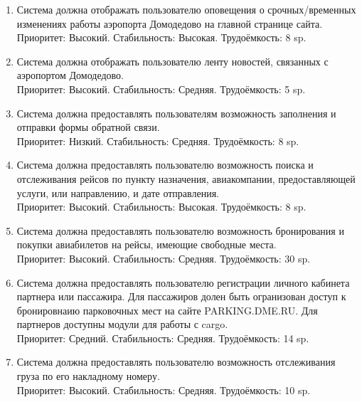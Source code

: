 \begin{enumerate}
      \item Система должна отображать пользователю оповещения о
            срочных/временных изменениях работы аэропорта
            Домодедово на главной странице сайта. \\
            Приоритет: Высокий. Стабильность: Высокая. Трудоёмкость: 8 sp.

      \item Система должна отображать пользователю ленту
            новостей, связанных с аэропортом Домодедово. \\
            Приоритет: Высокий. Стабильность: Средняя. Трудоёмкость: 5 sp.

      \item Система должна предоставлять пользователям возможность заполнения
            и отправки формы обратной связи. \\
            Приоритет: Низкий. Стабильность: Средняя. Трудоёмкость: 8 sp.

      \item Система должна предоставлять пользователю возможность поиска
            и отслеживания рейсов по пункту назначения,
            авиакомпании, предоставляющей услуги, или
            направлению, и дате отправления. \\
            Приоритет: Высокий. Стабильность: Высокая. Трудоёмкость: 8 sp.

      \item Система должна предоставлять пользователю возможность бронирования
            и покупки авиабилетов на рейсы, имеющие
            свободные места. \\
            Приоритет: Высокий. Стабильность: Средняя. Трудоёмкость: 30 sp.

      \item Система должна предоставлять пользователю
            регистрации личного кабинета партнера или
            пассажира. Для пассажиров долен быть
            огранизован доступ к бронировнаию парковочных
            мест на сайте PARKING.DME.RU. Для партнеров
            доступны модули для работы с cargo. \\
            Приоритет: Средний. Стабильность: Средняя. Трудоёмкость: 14 sp.

      \item Система должна предоставлять пользователю возможность
            отслеживания груза по его накладному номеру. \\
            Приоритет: Высокий. Стабильность: Средняя. Трудоёмкость: 10 sp.


\end{enumerate}
